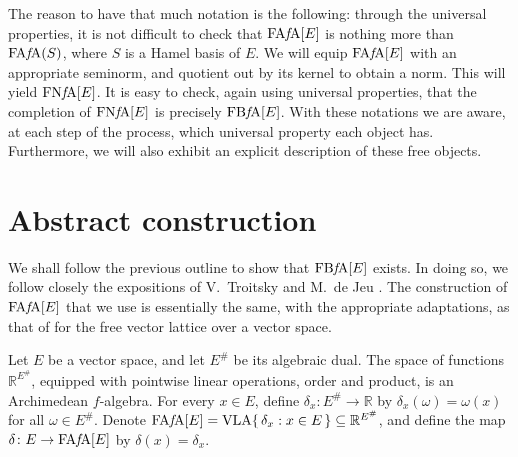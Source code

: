 \documentclass{memo-l}
\theoremstyle{definition}
\theoremstyle{remark}
\numberwithin{section}{chapter}
\numberwithin{equation}{chapter}
\newcommand\R{\ensuremath{\mathbb{R}}}
\newcommand{\falg}{$f\!$-algebra}
\newcommand{\VLA}{\operatorname{VLA}}
\newcommand{\FAFA}[1]{\operatorname{FA{\it f}\!A}(#1)}
\newcommand{\FAFAv}[1]{\operatorname{FA{\it f}\!A}[#1]}
\newcommand{\FNFA}[1]{\operatorname{FN{\it f}\!A}[#1]}
\newcommand{\FBFA}[1]{\operatorname{FB{\it f}\!A}[#1]}
\begin{document}
The reason to have that much notation is the following: through the
universal properties, it is not difficult to check that $\FAFAv E$ is
nothing more than $\FAFA S$, where $S$ is a Hamel basis of $E$. We will
equip $\FAFAv E$ with an appropriate seminorm, and quotient out by its kernel
to obtain a norm. This will yield $\FNFA E$. It is easy to check,
again using universal properties, that
the completion of $\FNFA E$ is precisely $\FBFA E$. With these
notations we are aware, at each step of the process, which universal
property each object has. Furthermore, we will also
exhibit an explicit description of these free objects.

\section{Abstract construction}\label{sec:abstract_construction}

We shall follow the previous outline to show that $\FBFA E$ exists. In
doing so, we follow closely the expositions of V.\ Troitsky
\cite{troitsky2019} and M.\ de Jeu \cite{de_jeu2021}.
The construction of $\FAFAv E$ that we use is essentially the
same, with the appropriate adaptations, as that of \cite{troitsky2019} for
the free vector lattice over a vector space.

Let $E$ be a vector space, and let $E^{\#}$ be its algebraic dual. The
space of functions $\R^{E^{\#}}$, equipped with pointwise linear
operations, order and product, is an Archimedean \falg. For
every $x \in E$, define $\delta _x\colon E^{\#}\to \R$ by $\delta
_x(\omega )=\omega (x)$ for all $\omega \in E^{\#}$. Denote $\FAFAv
E=\VLA \{\, \delta _x : x \in E \, \} \subseteq \R^{E^{\#}}$, and
define the map $\delta \colon E\to \FAFAv E$ by $\delta (x)=\delta
_x$.
\end{document}
